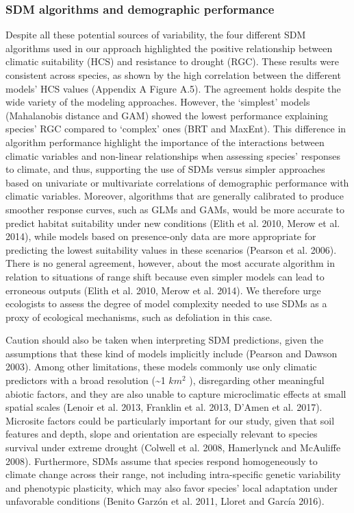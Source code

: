 \documentclass[11pt,twoside]{reedthesis}
\begin{document}
\subsubsection{SDM algorithms and demographic
performance}\label{sdm-algorithms-and-demographic-performance}

Despite all these potential sources of variability, the four different
SDM algorithms used in our approach highlighted the positive
relationship between climatic suitability (HCS) and resistance to
drought (RGC). These results were consistent across species, as shown by
the high correlation between the different models' HCS values (Appendix
A Figure A.5). The agreement holds despite the wide variety of the
modeling approaches. However, the `simplest' models (Mahalanobis
distance and GAM) showed the lowest performance explaining species' RGC
compared to `complex' ones (BRT and MaxEnt). This difference in
algorithm performance highlight the importance of the interactions
between climatic variables and non-linear relationships when assessing
species' responses to climate, and thus, supporting the use of SDMs
versus simpler approaches based on univariate or multivariate
correlations of demographic performance with climatic variables.
Moreover, algorithms that are generally calibrated to produce smoother
response curves, such as GLMs and GAMs, would be more accurate to
predict habitat suitability under new conditions (Elith et al. 2010,
Merow et al. 2014), while models based on presence-only data are more
appropriate for predicting the lowest suitability values in these
scenarios (Pearson et al. 2006). There is no general agreement, however,
about the most accurate algorithm in relation to situations of range
shift because even simpler models can lead to erroneous outputs (Elith
et al. 2010, Merow et al. 2014). We therefore urge ecologists to assess
the degree of model complexity needed to use SDMs as a proxy of
ecological mechanisms, such as defoliation in this case.\par

Caution should also be taken when interpreting SDM predictions, given
the assumptions that these kind of models implicitly include (Pearson
and Dawson 2003). Among other limitations, these models commonly use
only climatic predictors with a broad resolution (\textasciitilde{}1
\(km^2\) ), disregarding other meaningful abiotic factors, and they are
also unable to capture microclimatic effects at small spatial scales
(Lenoir et al. 2013, Franklin et al. 2013, D'Amen et al. 2017).
Microsite factors could be particularly important for our study, given
that soil features and depth, slope and orientation are especially
relevant to species survival under extreme drought (Colwell et al. 2008,
Hamerlynck and McAuliffe 2008). Furthermore, SDMs assume that species
respond homogeneously to climate change across their range, not
including intra-specific genetic variability and phenotypic plasticity,
which may also favor species' local adaptation under unfavorable
conditions (Benito Garzón et al. 2011, Lloret and García 2016).\par
\end{document}
